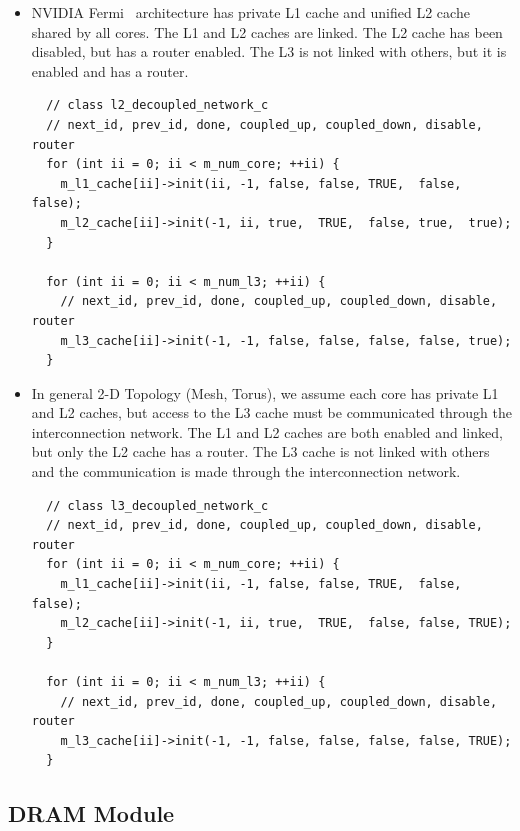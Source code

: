 \begin{itemize}
\begin{lstlisting}
  \end{lstlisting}
  \smallskip

  \item NVIDIA Fermi~\cite{fermi} architecture has private L1 cache
  and unified L2 cache shared by all cores. The L1 and L2 caches are
  linked. The L2 cache has been disabled, but has a router
  enabled. The L3 is not linked with others, but it is enabled and has
  a router.

  \smallskip
  \begin{lstlisting}
  // class l2_decoupled_network_c
  // next_id, prev_id, done, coupled_up, coupled_down, disable, router
  for (int ii = 0; ii < m_num_core; ++ii) {
    m_l1_cache[ii]->init(ii, -1, false, false, TRUE,  false, false);
    m_l2_cache[ii]->init(-1, ii, true,  TRUE,  false, true,  true);
  }

  for (int ii = 0; ii < m_num_l3; ++ii) {
    // next_id, prev_id, done, coupled_up, coupled_down, disable, router
    m_l3_cache[ii]->init(-1, -1, false, false, false, false, true);
  }

  \end{lstlisting}
  \smallskip
  
  \item In general 2-D Topology (Mesh, Torus), we assume each core has
  private L1 and L2 caches, but access to the L3 cache must be
  communicated through the interconnection network. The L1 and L2
  caches are both enabled and linked, but only the L2 cache has a
  router. The L3 cache is not linked with others and the communication
  is made through the interconnection network.

  \smallskip
  \begin{lstlisting}
  // class l3_decoupled_network_c
  // next_id, prev_id, done, coupled_up, coupled_down, disable, router
  for (int ii = 0; ii < m_num_core; ++ii) {
    m_l1_cache[ii]->init(ii, -1, false, false, TRUE,  false, false);
    m_l2_cache[ii]->init(-1, ii, true,  TRUE,  false, false, TRUE);
  }

  for (int ii = 0; ii < m_num_l3; ++ii) {
    // next_id, prev_id, done, coupled_up, coupled_down, disable, router
    m_l3_cache[ii]->init(-1, -1, false, false, false, false, TRUE);
  }

  \end{lstlisting}
  \smallskip

\end{itemize}

\subsection{DRAM Module} 





